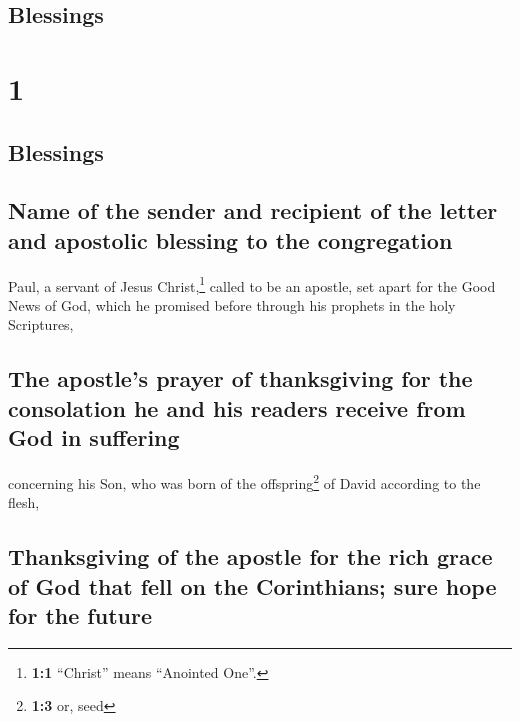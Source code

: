 \begin{paracol}{2}
\switchcolumn
\begin{otherlanguage}{english}

\hypertarget{blessings}{%
\subsection{Blessings}\label{blessings}}

\hypertarget{section-1}{%
\section{1}\label{section-1}}

\hypertarget{blessings-1}{%
\subsection{Blessings}\label{blessings-1}}

\hypertarget{name-of-the-sender-and-recipient-of-the-letter-and-apostolic-blessing-to-the-congregation}{%
\subsection{Name of the sender and recipient of the letter and apostolic
blessing to the
congregation}\label{name-of-the-sender-and-recipient-of-the-letter-and-apostolic-blessing-to-the-congregation}}

 Paul, a servant of Jesus Christ,\footnote{\textbf{1:1}
  ``Christ'' means ``Anointed One''.} called to be an apostle, set apart
for the Good News of God,  which he promised before
through his prophets in the holy Scriptures,

\hypertarget{the-apostles-prayer-of-thanksgiving-for-the-consolation-he-and-his-readers-receive-from-god-in-suffering}{%
\subsection{The apostle's prayer of thanksgiving for the consolation he
and his readers receive from God in
suffering}\label{the-apostles-prayer-of-thanksgiving-for-the-consolation-he-and-his-readers-receive-from-god-in-suffering}}

 concerning his Son, who was born of the
offspring\footnote{\textbf{1:3} or, seed} of David according to the
flesh,

\hypertarget{thanksgiving-of-the-apostle-for-the-rich-grace-of-god-that-fell-on-the-corinthians-sure-hope-for-the-future}{%
\subsection{Thanksgiving of the apostle for the rich grace of God that
fell on the Corinthians; sure hope for the
future}\label{thanksgiving-of-the-apostle-for-the-rich-grace-of-god-that-fell-on-the-corinthians-sure-hope-for-the-future}}


\end{otherlanguage}
\end{paracol}

